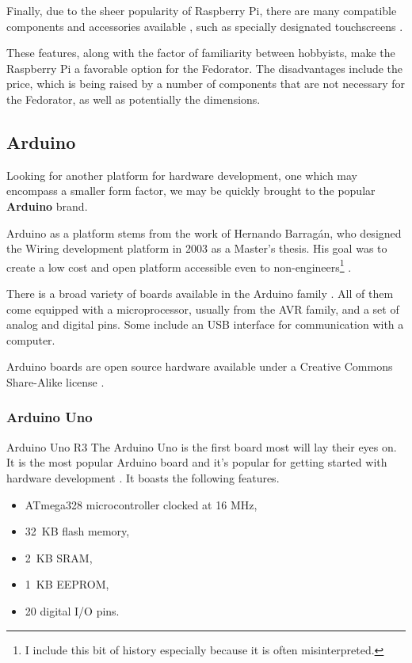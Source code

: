             Finally, due to the sheer popularity of Raspberry Pi, there are many compatible components and accessories available \cite{rpi-rs-components} \cite{rpi-the-pi-hut-store}, such as specially designated touchscreens \cite{rpi-official-touchscreen}.
            
            These features, along with the factor of familiarity between hobbyists, make the Raspberry Pi a favorable option for the Fedorator.  The disadvantages include the price, which is being raised by a number of components that are not necessary for the Fedorator, as well as potentially the dimensions.
        \subsection{Arduino}
            Looking for another platform for hardware development, one which may encompass a smaller form factor, we may be quickly brought to the popular \textbf{Arduino} brand.
            
            Arduino as a platform stems from the work of Hernando Barragán, who designed the Wiring development platform in 2003 as a Master's thesis.  His goal was to create a low cost and open platform accessible even to non-engineers\footnote{I include this bit of history especially because it is often misinterpreted.} \cite{arduino-untold-history}. 
            
            There is a broad variety of boards available in the Arduino family \cite{arduino-products}.  All of them come equipped with a microprocessor, usually from the AVR family, and a set of analog and digital pins.  Some include an USB interface for communication with a computer.
            
            Arduino boards are open source hardware available under a Creative Commons Share-Alike license \cite{arduino-faq-open-hw}.
            
            \subsubsection{Arduino Uno}
                    {Arduino Uno R3  \cite{arduino-wikimedia-uno}}
                The Arduino Uno is the first board most will lay their eyes on.  It is the most popular Arduino board and it's popular for getting started with hardware development \cite{arduino-uno}.  It boasts the following features.
                
                \begin{itemize}
                    \item ATmega328 microcontroller clocked at 16 MHz,
                    \item 32~KB flash memory,
                    \item 2~KB SRAM,
                    \item 1~KB EEPROM,
                    \item 20 digital I/O pins.
                \end{itemize}
                
